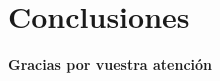 \documentclass[12pt,aspectratio=169]{beamer}
\numberwithin{equation}{section}
\theoremstyle{definition}
\begin{document}
\section{Conclusiones}



\begin{frame}
    \Huge{\centerline{\textbf{Gracias por vuestra atenci\'on}}}
\end{frame}

\end{document}
